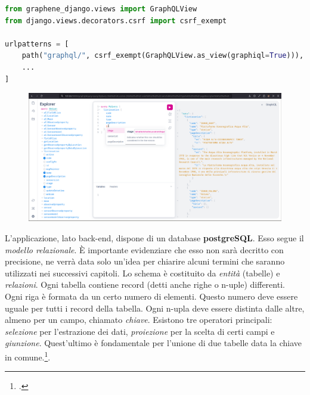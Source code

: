 \documentclass[./main.tex]{subfiles}
\begin{document}
\begin{lstlisting}[language=Python, caption=urls.py, label=lst:graphiql_url]
from graphene_django.views import GraphQLView
from django.views.decorators.csrf import csrf_exempt

urlpatterns = [
    path("graphql/", csrf_exempt(GraphQLView.as_view(graphiql=True))),
    ...
]
\end{lstlisting}

\begin{figure}[!ht]
\noindent\begin{minipage}{\textwidth}
\vspace{1cm}
\includegraphics[width=\textwidth]{images/graphiql_interface.pdf}
\captionsetup{font=footnotesize, hypcap=false}
\label{fig:grahiql_gui}
\end{minipage}
\vspace{0.25cm}
\end{figure}

L'applicazione, lato back-end, dispone di un database \textbf{postgreSQL}. Esso segue il \textit{modello relazionale}. È importante evidenziare che esso non sarà decritto con precisione, ne verrà data solo un'idea per chiarire alcuni termini che saranno utilizzati nei successivi capitoli. Lo schema è costituito da \textit{entità} (tabelle) e \textit{relazioni}. Ogni tabella contiene record (detti anche righe o n-uple) differenti. Ogni riga è formata da un certo numero di elementi. Questo numero deve essere uguale per tutti i record della tabella. Ogni n-upla deve essere distinta dalle altre, almeno per un campo, chiamato \textit{chiave}. Esistono tre operatori principali: \textit{selezione} per l'estrazione dei dati, \textit{proiezione} per la scelta di certi campi e \textit{giunzione}. Quest'ultimo è fondamentale per l'unione di due tabelle data la chiave in comune.\footcite[28-40]{doretti-concetti-base-db}.\par
\end{document}
